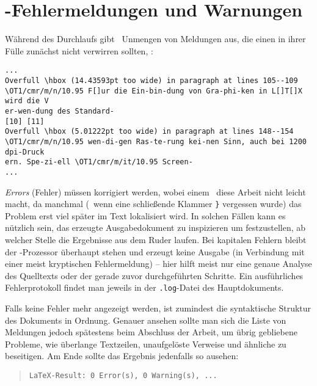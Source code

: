 \section{\latex-Fehlermeldungen und Warnungen}

Während des Durchlaufs gibt \latex\ Unmengen von
Meldungen aus, die einen in ihrer Fülle zunächst nicht verwirren
sollten, \zB:

\begin{scriptsize}
\begin{verbatim}
...
Overfull \hbox (14.43593pt too wide) in paragraph at lines 105--109
\OT1/cmr/m/n/10.95 F[]ur die Ein-bin-dung von Gra-phi-ken in L[]T[]X wird die V
er-wen-dung des Standard-
[10] [11]
Overfull \hbox (5.01222pt too wide) in paragraph at lines 148--154
\OT1/cmr/m/n/10.95 wen-di-gen Ras-te-rung kei-nen Sinn, auch bei 1200 dpi-Druck
ern. Spe-zi-ell \OT1/cmr/m/it/10.95 Screen-
...
\end{verbatim}
\end{scriptsize}
%
\emph{Errors} (Fehler) müssen korrigiert werden, wobei einem \latex\ diese Arbeit 
nicht leicht macht, da manchmal (\zB\ wenn eine schließende Klammer \verb!}! 
vergessen wurde) das Problem erst viel später im Text lokalisiert wird.
In solchen Fällen kann es nützlich sein, das erzeugte Ausgabedokument
zu inspizieren um festzustellen, ab welcher Stelle die Ergebnisse
aus dem Ruder laufen.  
Bei kapitalen Fehlern bleibt der \latex-Prozessor überhaupt stehen und 
erzeugt keine Ausgabe (in Verbindung mit einer meist kryptischen
Fehlermeldung) -- hier hilft meist nur eine genaue
Analyse des Quelltexts oder der gerade zuvor durchgeführten Schritte.
Ein ausführliches Fehlerprotokoll findet man jeweils in der \verb!.log!-Datei 
des Hauptdokuments.

Falls keine Fehler mehr angezeigt werden, ist zumindest die syntaktische Struktur
des Dokuments in Ordnung.
Genauer ansehen sollte man sich die Liste von Meldungen jedoch
spätestens beim Abschluss der Arbeit, um übrig gebliebene Probleme, wie
überlange Textzeilen, unaufgelöste Verweise und ähnliche zu
beseitigen.
Am Ende sollte das Ergebnis jedenfalls so ausehen:
%
\begin{quote}
\verb!LaTeX-Result: 0 Error(s), 0 Warning(s), ...!
\end{quote}
